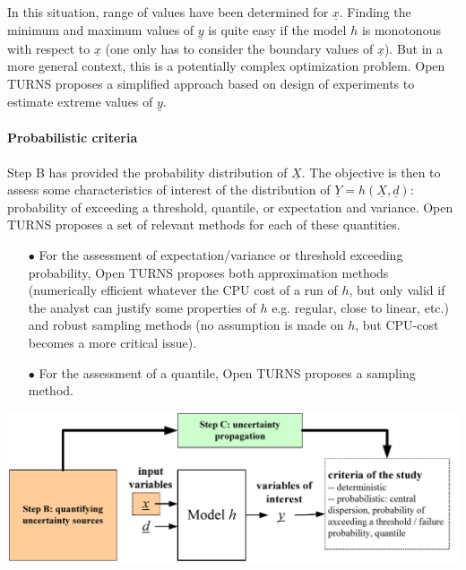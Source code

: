 In this situation, range of values have been determined for $\underline{x}$. Finding the minimum and maximum values of $\underline{y}$ is quite easy if the model $h$ is monotonous with respect to $\underline{x}$ (one only has to consider the boundary values of $\underline{x}$). But in a more general context, this is a potentially complex optimization problem. Open TURNS proposes a simplified approach based on design of experiments to estimate extreme values of $\underline{y}$.

\paragraph{Probabilistic criteria}
\par

Step B has provided the probability distribution of $\underline{X}$. The objective is then to assess some characteristics of interest of the distribution of $\underline{Y} = h \left( \underline{X},\underline{d} \right)$: probability of exceeding a threshold, quantile, or expectation and variance. Open TURNS proposes a set of relevant methods for each of these quantities.

\begin{itemize}

\item[$\bullet$] For the assessment of expectation/variance or threshold exceeding probability, Open TURNS proposes both approximation methods (numerically efficient whatever the CPU cost of a run of $h$, but only valid if the analyst can justify some properties of $h$ e.g. regular, close to linear, etc.) and robust sampling methods (no assumption is made on $h$, but CPU-cost becomes a more critical issue).

\item[$\bullet$] For the assessment of  a quantile, Open TURNS proposes a sampling method.

\end{itemize}

\begin{center}
  \includegraphics[scale=0.8]{flow4.pdf}
\end{center}

